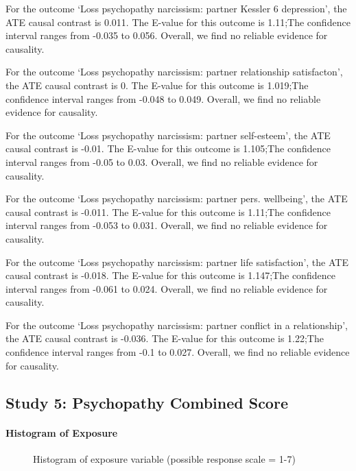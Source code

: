 \documentclass[
  singlecolumn]{article}
\let\oldparagraph\paragraph
\renewcommand{\paragraph}[1]{\oldparagraph{#1}\mbox{}}
\begin{document}
For the outcome `Loss psychopathy narcissism: partner Kessler 6
depression', the ATE causal contrast is 0.011. The E-value for this
outcome is 1.11;The confidence interval ranges from -0.035 to 0.056.
Overall, we find no reliable evidence for causality.

For the outcome `Loss psychopathy narcissism: partner relationship
satisfacton', the ATE causal contrast is 0. The E-value for this outcome
is 1.019;The confidence interval ranges from -0.048 to 0.049. Overall,
we find no reliable evidence for causality.

For the outcome `Loss psychopathy narcissism: partner self-esteem', the
ATE causal contrast is -0.01. The E-value for this outcome is 1.105;The
confidence interval ranges from -0.05 to 0.03. Overall, we find no
reliable evidence for causality.

For the outcome `Loss psychopathy narcissism: partner pers. wellbeing',
the ATE causal contrast is -0.011. The E-value for this outcome is
1.11;The confidence interval ranges from -0.053 to 0.031. Overall, we
find no reliable evidence for causality.

For the outcome `Loss psychopathy narcissism: partner life
satisfaction', the ATE causal contrast is -0.018. The E-value for this
outcome is 1.147;The confidence interval ranges from -0.061 to 0.024.
Overall, we find no reliable evidence for causality.

For the outcome `Loss psychopathy narcissism: partner conflict in a
relationship', the ATE causal contrast is -0.036. The E-value for this
outcome is 1.22;The confidence interval ranges from -0.1 to 0.027.
Overall, we find no reliable evidence for causality.

\subsection{Study 5: Psychopathy Combined
Score}\label{study-5-psychopathy-combined-score}

\paragraph{Histogram of Exposure}\label{histogram-of-exposure-4}

\begin{figure}


\caption{\label{fig-histogram-psychopathy}Histogram of exposure variable
(possible response scale = 1-7)}

\end{figure}%
\end{document}
